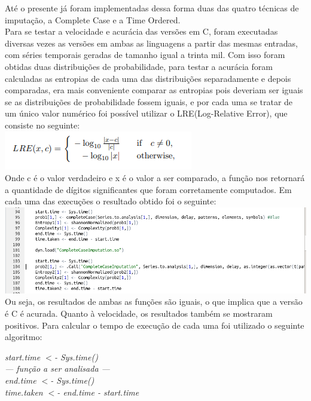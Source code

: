 \documentclass{article}
\begin{document}
Até o presente já foram implementadas dessa forma duas das quatro técnicas de imputação, a Complete Case e a Time Ordered. \\
Para se testar a velocidade e acurácia das versões em C, foram executadas diversas vezes as versões em ambas as linguagens a partir das mesmas entradas, com séries temporais geradas de tamanho igual a trinta mil. Com isso foram obtidas duas distribuições de probabilidade, para testar a acurácia foram calculadas as entropias de cada uma das distribuições separadamente e depois comparadas, era mais conveniente comparar as entropias pois deveriam ser iguais se as distribuições de probabilidade fossem iguais, e por cada uma se tratar de um único valor numérico foi possível utilizar o LRE(Log-Relative Error)\cite{almiron2010numerical}, que consiste no seguinte:\\
    
\includegraphics[width=0.50\columnwidth]{LRE1.png}\\

Onde c é o valor verdadeiro e x é o valor a ser comparado, a função nos retornará a quantidade de dígitos significantes que foram corretamente computados. Em cada uma das execuções o resultado obtido foi o seguinte:\\
    
\includegraphics[width=0.80\columnwidth]{LRE.png}\\

Ou seja, os resultados de ambas as funções são iguais, o que implica que a versão é C é acurada.
Quanto à velocidade, os resultados também se mostraram positivos. Para calcular o tempo de execução de cada uma foi utilizado o seguinte algoritmo:
    
\begin{flushleft}
\textit{start.time $<$- Sys.time()\\
--- função a ser analisada ---\\
end.time $<$- Sys.time()\\
time.taken $<$- end.time - start.time\\}
\end{flushleft}
\end{document}
